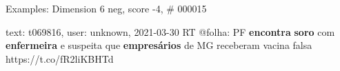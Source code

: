 \begin{frame}{Examples: Dimension 6 neg, score -4, \# 000015}
\footnotesize
\begin{alertblock}{text: t069816, user: unknown, 2021-03-30}
RT @folha: PF \textbf{encontra} \textbf{soro} com \textbf{enfermeira} e 
suspeita que \textbf{empresários} de MG receberam vacina falsa 
https://t.co/fR2liKBHTd 
\end{alertblock}
\end{frame}
